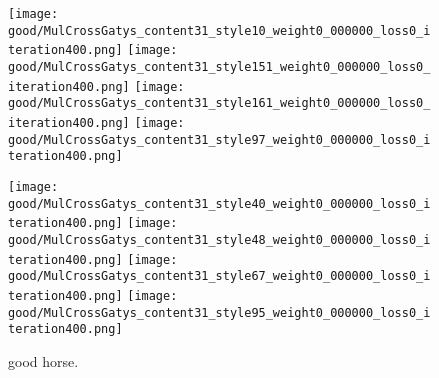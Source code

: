   \begin{figure*}[!htbp]
  \centering
  \small 
  
      \texttt{[image: good/MulCrossGatys\_content31\_style10\_weight0\_000000\_loss0\_iteration400.png]}
      \texttt{[image: good/MulCrossGatys\_content31\_style151\_weight0\_000000\_loss0\_iteration400.png]}
      \texttt{[image: good/MulCrossGatys\_content31\_style161\_weight0\_000000\_loss0\_iteration400.png]}
      \texttt{[image: good/MulCrossGatys\_content31\_style97\_weight0\_000000\_loss0\_iteration400.png]}
      
      \texttt{[image: good/MulCrossGatys\_content31\_style40\_weight0\_000000\_loss0\_iteration400.png]}
      \texttt{[image: good/MulCrossGatys\_content31\_style48\_weight0\_000000\_loss0\_iteration400.png]}
      \texttt{[image: good/MulCrossGatys\_content31\_style67\_weight0\_000000\_loss0\_iteration400.png]}
      \texttt{[image: good/MulCrossGatys\_content31\_style95\_weight0\_000000\_loss0\_iteration400.png]}
  \caption{good horse.  }
  \label{fig:good1}
  \end{figure*}
  
